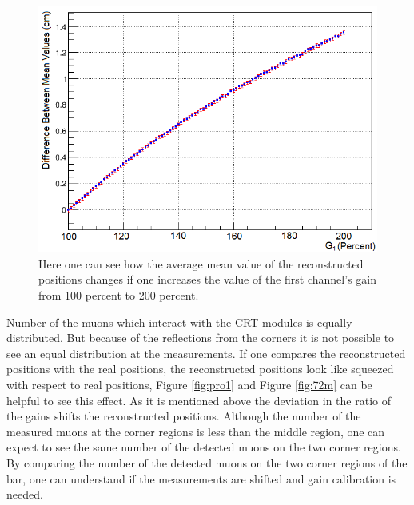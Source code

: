 \documentclass[a4paper]{article}\linespread{1.4}
\begin{document}
\begin{figure}[] \hspace*{-1cm} \includegraphics[width=130mm,scale=1.0]{gdp.png} \caption{Here one can see how the average mean value of the reconstructed positions changes if one increases the value of the first channel's gain from 100 percent to 200 percent.} \label{fig:gdp} \end{figure}  

Number of the muons which interact with the CRT modules is equally distributed. %
But because of the reflections from the corners it is not possible to see an equal distribution at the measurements. 
If one compares the reconstructed positions with the real positions, the reconstructed positions look like squeezed with respect to real positions, Figure \ref{fig:pro1} and Figure \ref{fig:72m} can be helpful to see this effect. 
As it is mentioned above the deviation in the ratio of the gains shifts the reconstructed positions. 
Although the number of the measured muons at the corner regions is less than the middle region, one can expect to see the same number of the detected muons on the two corner regions. 
By comparing the number of the detected muons on the two corner regions of the bar, one can understand if the measurements are shifted and gain calibration is needed. 

\end{document}
